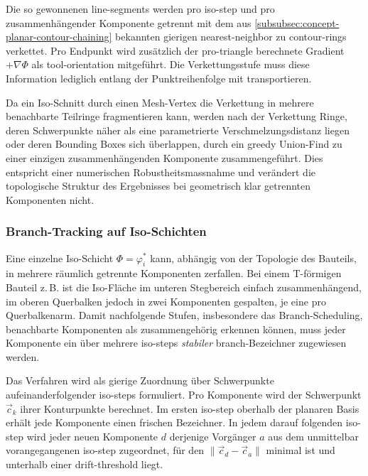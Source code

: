                 Die so gewonnenen \glspl{line-segment} werden pro \gls{iso-step} und pro zusammenhängender Komponente getrennt mit dem aus \cref{subsubsec:concept-planar-contour-chaining} bekannten gierigen \gls{nearest-neighbor} zu \glspl{contour-ring} verkettet.
                Pro Endpunkt wird zusätzlich der pro-\gls{triangle} berechnete Gradient $+\nabla\Phi$ als \gls{tool-orientation} mitgeführt.
                Die Verkettungsstufe muss diese Information lediglich entlang der Punktreihenfolge mit transportieren.

                Da ein Iso-Schnitt durch einen Mesh-Vertex die Verkettung in mehrere benachbarte Teilringe fragmentieren kann, werden nach der Verkettung Ringe, deren Schwerpunkte näher als eine parametrierte Verschmelzungs\-distanz liegen oder deren Bounding Boxes sich überlappen, durch ein greedy Union-Find zu einer einzigen zusammenhängenden Komponente zusammengeführt.
                Dies entspricht einer numerischen Robustheitsmassnahme und verändert die topologische Struktur des Ergebnisses bei geometrisch klar getrennten Komponenten nicht.

            \subsubsection{Branch-Tracking auf Iso-Schichten}\label{subsubsec:concept-crystal-branch-tracking} 
                Eine einzelne Iso-Schicht $\Phi = \varphi^*_i$ kann, abhängig von der Topologie des Bauteils, in mehrere räumlich getrennte Komponenten zerfallen.
                Bei einem T-förmigen Bauteil z.\,B. ist die Iso-Fläche im unteren Stegbereich einfach zusammenhängend, im oberen Querbalken jedoch in zwei Komponenten gespalten, je eine pro Querbalkenarm.
                Damit nachfolgende Stufen, insbesondere das Branch-Scheduling, benachbarte Komponenten als zusammengehörig erkennen können, muss jeder Komponente ein über mehrere \glspl{iso-step} \emph{stabiler} \gls{branch}-Bezeichner zugewiesen werden.

                Das Verfahren wird als gierige Zuordnung über Schwerpunkte aufeinanderfolgender \glspl{iso-step} formuliert.
                Pro Komponente wird der Schwerpunkt $\vec{c}_k$ ihrer Konturpunkte berechnet.
                Im ersten \gls{iso-step} oberhalb der planaren Basis erhält jede Komponente einen frischen Bezeichner.
                In jedem darauf folgenden \gls{iso-step} wird jeder neuen Komponente $d$ derjenige Vorgänger $a$ aus dem unmittelbar vorangegangenen \gls{iso-step} zugeordnet, für den $\lVert\vec{c}_d - \vec{c}_a\rVert$ minimal ist und unterhalb einer \gls{drift-threshold} liegt.

